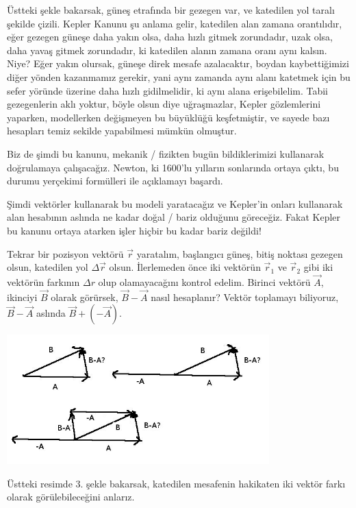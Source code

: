 \documentclass[12pt,fleqn]{article}\usepackage{../../common}
\begin{document}
Üstteki şekle bakarsak, güneş etrafında bir gezegen var, ve katedilen yol taralı
şekilde çizili. Kepler Kanunu şu anlama gelir, katedilen alan zamana
orantılıdır, eğer gezegen güneşe daha yakın olsa, daha hızlı gitmek zorundadır,
uzak olsa, daha yavaş gitmek zorundadır, ki katedilen alanın zamana oranı aynı
kalsın. Niye? Eğer yakın olursak, güneşe direk mesafe azalacaktır, boydan
kaybettiğimizi diğer yönden kazanmamız gerekir, yani aynı zamanda aynı alanı
katetmek için bu sefer yöründe üzerine daha hızlı gidilmelidir, ki aynı alana
erişebilelim. Tabii gezegenlerin aklı yoktur, böyle olsun diye uğraşmazlar,
Kepler gözlemlerini yaparken, modellerken değişmeyen bu büyüklüğü keşfetmiştir,
ve sayede bazı hesapları temiz sekilde yapabilmesi mümkün olmuştur.

Biz de şimdi bu kanunu, mekanik / fizikten bugün bildiklerimizi kullanarak
doğrulamaya çalışacağız. Newton, ki 1600'lu yılların sonlarında ortaya
çıktı, bu durumu yerçekimi formülleri ile açıklamayı başardı. 

Şimdi vektörler kullanarak bu modeli yaratacağız ve Kepler'in onları
kullanarak alan hesabının aslında ne kadar doğal / bariz olduğunu
göreceğiz. Fakat Kepler bu kanunu ortaya atarken işler hiçbir bu kadar
bariz değildi!

Tekrar bir pozisyon vektörü $\vec{r}$ yaratalım, başlangıcı güneş, bitiş noktası
gezegen olsun, katedilen yol $\Delta \vec{r}$ olsun. İlerlemeden önce iki
vektörün $\vec{r}_1$ ve $\vec{r}_2$ gibi iki vektörün farkının $\Delta r$ olup
olamayacağını kontrol edelim. Birinci vektörü $\vec{A}$, ikinciyi $\vec{B}$
olarak görürsek, $\vec{B} - \vec{A}$ nasıl hesaplanır?  Vektör toplamayı
biliyoruz, $\vec{B} - \vec{A}$ aslında $\vec{B} + (-\vec{A})$.

\begin{center}
\includegraphics[height=5cm]{6_11.png}
\end{center}

Üstteki resimde 3. şekle bakarsak, katedilen mesafenin hakikaten iki vektör
farkı olarak görülebileceğini anlarız. 
\end{document}
